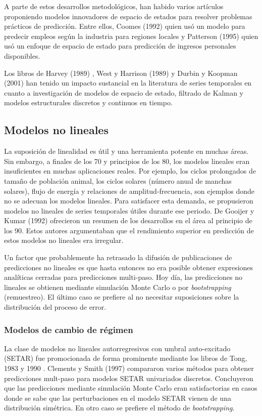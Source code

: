 \documentclass{llncs}
\begin{document}
A parte de estos desarrollos metodológicos, han habido varios artículos proponiendo modelos innovadores de espacio de estados para resolver problemas prácticos de predicción. Entre ellos, Coomes (1992) \cite{Coomes1992473} quien usó un modelo para predecir empleos según la industria para regiones locales y Patterson (1995) \cite{Patterson1995395} quien usó un enfoque de espacio de estado para predicción de ingresos personales disponibles. 

Los libros de Harvey (1989) \cite{Harvey1989}, West y Harrison (1989) \cite{West1997}y Durbin y Koopman (2001) \cite{Durbin2001} han tenido un impacto sustancial en la literatura de series temporales en cuanto a investigación de modelos de espacio de estado, filtrado de Kalman y modelos estructurales discretos y continuos en tiempo. 


\subsection{Modelos no lineales}

La suposición de linealidad es útil y una herramienta potente en muchas áreas. Sin embargo, a finales de los 70 y principios de los 80, los modelos lineales eran insuficientes en muchas aplicaciones reales. Por ejemplo, los ciclos prolongados de tamaño de población animal, los ciclos solares (número anual de manchas solares), flujo de energía y relaciones de amplitud-frecuencia, son ejemplos donde no se adecuan los modelos lineales. Para satisfacer esta demanda, se propusieron modelos no lineales de series temporales útiles durante ese periodo. De Gooijer y Kumar (1992)  \cite{DeGooijer1992135} ofrecieron un resumen de los desarrollos en el área al principio de los 90. Estos autores argumentaban que el rendimiento superior en predicción de estos modelos no lineales era irregular.

Un factor que probablemente ha retrasado la difusión de publicaciones de predicciones no lineales es que hasta entonces no era posible obtener expresiones analíticas cerradas para predicciones multi-paso. Hoy día, las predicciones no lineales se obtienen mediante simulación Monte Carlo o por \emph{bootstrapping} (remuestreo). El último caso se prefiere al no necesitar suposiciones sobre la distribución del proceso de error.


\subsubsection{Modelos de cambio de régimen}
La clase de modelos no lineales autorregresivos con umbral auto-excitado (SETAR) fue promocionada de forma prominente mediante los libros de Tong, 1983  \cite{Tong1983} y 1990  \cite{Tong1990}. Clements y Smith (1997)  \cite{Clements1997463} compararon varios métodos para obtener predicciones mult-paso para modelos SETAR univariados discretos. Concluyeron que las predicciones mediante simulación Monte Carlo eran satisfactorias en casos donde se sabe que las perturbaciones en el modelo SETAR vienen de una distribución simétrica. En otro caso se prefiere el método de \emph{bootstrapping}. 
\end{document}

